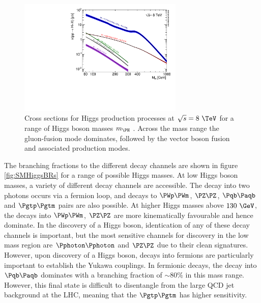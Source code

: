 \begin{figure}[htbp]
   \includegraphics[width=0.7\textwidth]{plots/theory/Higgs_XS_8TeV_lx.pdf}
\caption[Cross sections for Higgs production processes at $\sqrt{s}=8~\TeV$ for
a range of Higgs boson masses.]{Cross sections for Higgs production processes at $\sqrt{s}=8~\TeV$ for
a range of Higgs boson masses $m_{\PH}$ \cite{Heinemeyer:2013tqa}. Across the
mass range the gluon-fusion mode dominates, followed by the vector boson fusion
and associated production modes.}
\label{fig:SMHiggsXS}
\end{figure}

The branching fractions to the different decay channels are shown in
figure \ref{fig:SMHiggsBRs} for a range of possible Higgs masses. At low Higgs
boson masses, a variety of different decay channels are accessible. The decay
into two photons occurs via a fermion loop, and decays to $\PWp\PWm$, $\PZ\PZ$,
$\Pqb\Paqb$ and $\Pgtp\Pgtm$ pairs are also possible. At higher Higgs masses
above $130~\GeV$, the decays into $\PWp\PWm$, $\PZ\PZ$ are more kinematically
favourable and hence dominate. In the discovery of a Higgs boson, identication of
any of these decay channels is important, but the most sensitive channels for
discovery in the low mass region are $\Pphoton\Pphoton$ and $\PZ\PZ$ due to
their clean signatures. However, upon discovery of a Higgs boson, decays into 
fermions are particularly important
to establish the Yukawa couplings. In fermionic decays, the decay into
$\Pqb\Paqb$ dominates with a branching fraction of $\sim 80\%$ in this mass
range. However, this final state is difficult to disentangle from the large QCD
jet background at the LHC, meaning that the $\Pgtp\Pgtm$ has higher sensitivity.

